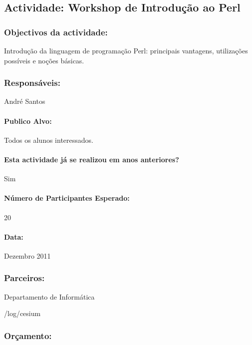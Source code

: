 \subsection{Actividade: Workshop  de Introdução ao Perl} %

\subsubsection*{Objectivos da actividade:}
Introdução da linguagem de programação Perl: principais vantagens, utilizações possíveis e noções básicas.

\subsubsection*{Responsáveis:}
\begin{itemizedash}
	\item{André Santos}
\end{itemizedash}

\paragraph{Publico Alvo: }
Todos os alunos interessados.

\paragraph{Esta actividade já se realizou em anos anteriores?}
Sim

\paragraph{Número de Participantes Esperado:}
20

\paragraph{Data:} Dezembro 2011

\subsubsection*{Parceiros:}
\begin{itemizedash}
    \item{Departamento de Informática}
	\item{/log/cesium}
\end{itemizedash}

\subsubsection*{Orçamento:}

